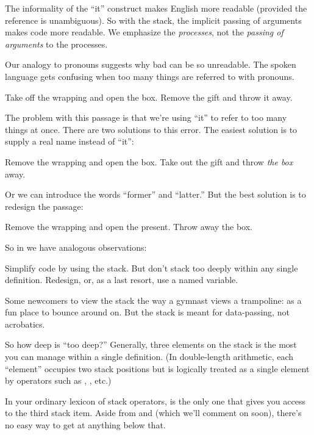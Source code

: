 The informality of the ``it'' construct makes English more readable
(provided the reference is unambiguous). So with the stack, the implicit
passing of arguments makes code more readable. We emphasize the
\emph{processes}, not the \emph{passing of arguments} to the processes.

Our analogy to pronouns suggests why bad \Forth{} can be so unreadable.
The spoken language gets confusing when too many things are
referred to with pronouns.

\begin{tfquot}
Take off the wrapping and open the box. Remove the gift and throw it
away.
\end{tfquot}
The problem with this passage is that we're using ``it'' to refer to too
many things at once. There are two solutions to this error. The easiest
solution is to supply a real name instead of ``it'':

\begin{tfquot}
Remove the wrapping and open the box. Take out the gift and throw
\emph{the box} away.
\end{tfquot}
Or we can introduce the words ``former'' and ``latter.'' But the best
solution is to redesign the passage:

\begin{tfquot}
Remove the wrapping and open the present. Throw away the box.
\end{tfquot}
So in \Forth{} we have analogous observations:

\begin{tip}
Simplify code by using the stack. But don't stack too deeply within any
single definition. Redesign, or, as a last resort, use a named variable.
\end{tip}
Some newcomers to \Forth{} view the stack the way a gymnast views a
trampoline: as a fun place to bounce around on. But the stack is meant for
data-passing, not acrobatics.

So how deep is ``too deep?'' Generally, three elements on the stack is
the most you can manage within a single definition. (In double-length
arithmetic, each ``element'' occupies two stack positions but is logically
treated as a single element by operators such as , ,
etc.)

In your ordinary lexicon of stack operators,  is the only one
that gives you access to the third stack item. Aside from  and
 (which we'll comment on soon), there's no easy way to get at
anything below that.


